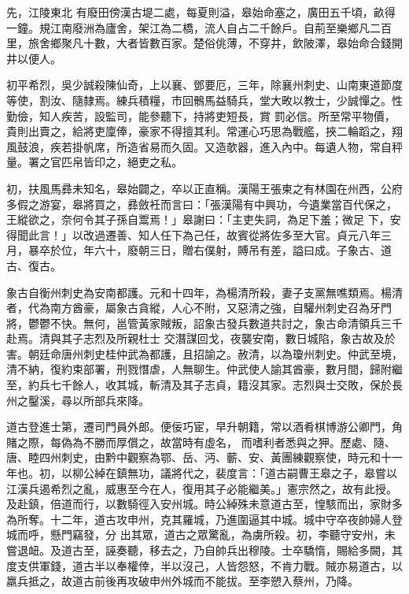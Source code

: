 \begin{pinyinscope}
 先，江陵東北
 有廢田傍漢古堤二處，每夏則溢，皋始命塞之，廣田五千頃，畝得一鐘。規江南廢洲為廬舍，架江為二橋，流人自占二千餘戶。自荊至樂鄉凡二百里，旅舍鄉聚凡十數，大者皆數百家。楚俗佻薄，不穿井，飲陂澤，皋始命合錢開井以便人。



 初平希烈，吳少誠殺陳仙奇，上以襄、鄧要厄，三年，除襄州刺史、山南東道節度等使，割汝、隨隸焉。練兵積糧，市回鶻馬益騎兵，堂大畋以教士，少誠憚之。性勤儉，知人疾苦，設監司，能參聽下，持將吏短長，賞
 罰必信。所至常平物價，貴則出賣之，給將吏廩俸，豪家不得擅其利。常運心巧思為戰艦，挾二輪蹈之，翔風鼓浪，疾若掛帆席，所造省易而久固。又造欹器，進入內中。每遺人物，常自秤量。署之官匹帛皆印之，絕吏之私。



 初，扶風馬彞未知名，皋始闢之，卒以正直稱。漢陽王張柬之有林園在州西，公府多假之游宴，皋將買之，彞斂衽而言曰：「張漢陽有中興功，今遺業當百代保之，王縱欲之，奈何令其子孫自鬻焉！」皋謝曰：「主吏失詞，為足下羞；微足
 下，安得聞此言！」以改過遷善、知人任下為己任，故賓從將佐多至大官。貞元八年三月，暴卒於位，年六十，廢朝三日，贈右僕射，賻吊有差，謚曰成。子象古、道古、復古。



 象古自衡州刺史為安南都護。元和十四年，為楊清所殺，妻子支黨無噍類焉。楊清者，代為南方酋豪，屬象古貪縱，人心不附，又惡清之強，自驩州刺史召為牙門將，鬱鬱不快。無何，邕管黃家賊叛，詔象古發兵數道共討之，象古命清領兵三千赴焉。清與其子志烈及所親杜士
 交潛謀回戈，夜襲安南，數日城陷，象古故及於害。朝廷命唐州刺史桂仲武為都護，且招諭之。赦清，以為瓊州刺史。仲武至境，清不納，復約束部署，刑戮憯虐，人無聊生。仲武使人諭其酋豪，數月間，歸附繼至，約兵七千餘人，收其城，斬清及其子志貞，籍沒其家。志烈與士交敗，保於長州之鑿溪，尋以所部兵來降。



 道古登進士第，遷司門員外郎。便佞巧宦，早升朝籍，常以酒肴棋博游公卿門，角賭之際，每偽為不勝而厚償之，故當時有虛名，
 而嗜利者悉與之狎。歷處、隨、唐、睦四州刺史，由黔中觀察為鄂、岳、沔、蘄、安、黃團練觀察使，時元和十一年也。初，以柳公綽在鎮無功，議將代之，裴度言：「道古嗣曹王皋之子，皋嘗以江漢兵遏希烈之亂，威惠至今在人，復用其子必能繼美。」憲宗然之，故有此授。及赴鎮，倍道而行，以數騎徑入安州城。時公綽殊未意道古至，惶駭而出，家財多為所奪。十二年，道古攻申州，克其羅城，乃進圍逼其中城。城中守卒夜帥婦人登城而呼，懸門竊發，分
 出其眾，道古之眾驚亂，為虜所殺。初，李聽守安州，未嘗退衄。及道古至，誣奏聽，移去之，乃自帥兵出穆陵。士卒驕惰，賜給多闕，其度支供軍錢，道古半以奉權倖，半以沒己，人皆怨怒，不肯力戰。賊亦易道古，以羸兵抵之，故道古前後再攻破申州外城而不能拔。至李愬入蔡州，乃降。




\end{pinyinscope}

